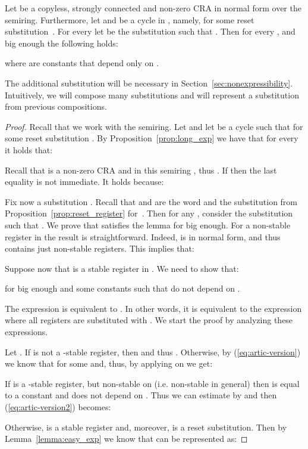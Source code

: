 \begin{lemma}
\label{lemma:loops}
Let  be a copyless, strongly connected and non-zero CRA in normal form over the  semiring. Furthermore, let  and  be a cycle in , namely,  for some reset substitution~.
For every  let  be the substitution such that . Then for every ,  and  big enough the following holds:

where  are constants that depend only on .
\end{lemma}

The additional substitution  will be necessary in Section~\ref{sec:nonexpressibility}. Intuitively, we will compose many substitutions and  will represent a substitution from previous compositions. \begin{proof}
Recall that we work with the  semiring. Let  and let  be a cycle such that  for some reset substitution .
By Proposition~\ref{prop:long_exp} we have that for every  it holds that:
\setlength{\jot}{4pt}

Recall that  is a non-zero CRA and in this semiring , thus . If  then the last equality is not immediate. It holds because:


Fix now a substitution .
Recall that  and  are the word and the substitution from Proposition~\ref{prop:reset_register} for~. 
Then for any , consider the substitution  such that .
We prove that  satisfies the lemma for  big enough.
For a non-stable register  in  the result is straightforward. 
Indeed,  is in normal form, and thus  contains just non-stable registers. 
This implies that:

Suppose now that  is a stable register in . We need to show that:

for  big enough and some constants  such that  do not depend on . 

The expression  is equivalent to . In other words, it is equivalent to the expression  where all registers  are substituted with . We start the proof by analyzing these expressions.

Let . If  is not a -stable register, then  and thus . 
Otherwise, by (\ref{eq:artic-version}) we know that  for some  and, thus,  by applying  on  we get: 

If  is a -stable register, but non-stable on  (i.e. non-stable in general) then  is equal to a constant and does not depend on . Thus we can estimate  by  and then (\ref{eq:artic-version2}) becomes:

Otherwise,  is a stable register and, moreover,  is a reset substitution. Then by Lemma~\ref{lemma:easy_exp} we know that  can be represented as:
\setlength{\jot}{4pt}


\end{proof}
